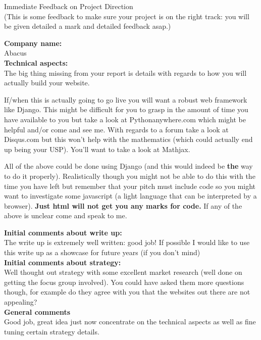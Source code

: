 \documentclass{article}
\begin{document}
\begin{center}
\Huge{Immediate Feedback on Project Direction}\\
\tiny{(This is some feedback to make sure your project is on the right track: you will be given detailed a mark and detailed feedback asap.)}
\end{center}


\normalsize
\textbf{Company name:}\\

Abacus \\

\textbf{Technical aspects:}\\

The big thing missing from your report is details with regards to how you will actually build your website.

If/when this is actually going to go live you will want a robust web framework like Django.
This might be difficult for you to grasp in the amount of time you have available to you but take a look at Pythonanywhere.com which might be helpful and/or come and see me.
With regards to a forum take a look at Disqus.com but this won't help with the mathematics (which could actually end up being your USP). You'll want to take a look at Mathjax.

All of the above could be done using Django (and this would indeed be \textbf{the} way to do it properly).
Realistically though you might not be able to do this with the time you have left but remember that your pitch must include code so you might want to investigate some javascript (a light language that can be interpreted by a browser). \textbf{Just html will not get you any marks for code.} If any of the above is unclear come and speak to me.

\textbf{Initial comments about write up:}\\

The write up is extremely well written: good job!
If possible I would like to use this write up as a showcase for future years (if you don't mind)\\

\textbf{Initial comments about strategy:}\\

Well thought out strategy with some excellent market research (well done on getting the focus group involved).
You could have asked them more questions though, for example do they agree with you that the websites out there are not appealing?\\

\textbf{General comments}\\

Good job, great idea just now concentrate on the technical aspects as well as fine tuning certain strategy details.
\end{document}
